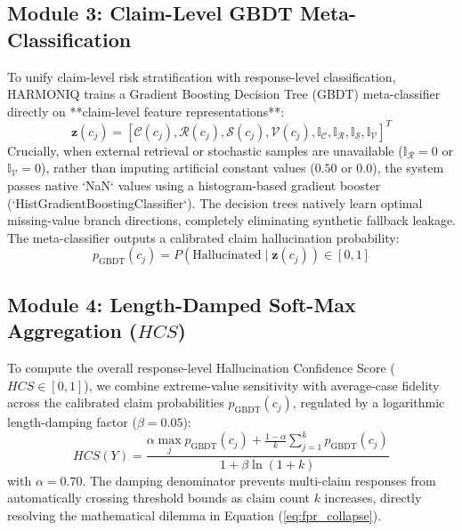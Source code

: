 \documentclass[conference]{IEEEtran}
\begin{document}
\subsection{Module 3: Claim-Level GBDT Meta-Classification}
To unify claim-level risk stratification with response-level classification, HARMONIQ trains a Gradient Boosting Decision Tree (GBDT) meta-classifier directly on **claim-level feature representations**:
\begin{equation}
    \mathbf{z}(c_j) = \left[ \mathcal{C}(c_j), \mathcal{R}(c_j), \mathcal{S}(c_j), \mathcal{V}(c_j), \mathbb{I}_{\mathcal{C}}, \mathbb{I}_{\mathcal{R}}, \mathbb{I}_{\mathcal{S}}, \mathbb{I}_{\mathcal{V}} \right]^T
\end{equation}
Crucially, when external retrieval or stochastic samples are unavailable ($\mathbb{I}_{\mathcal{R}} = 0$ or $\mathbb{I}_{\mathcal{V}} = 0$), rather than imputing artificial constant values ($0.50$ or $0.0$), the system passes native `NaN` values using a histogram-based gradient booster (`HistGradientBoostingClassifier`). The decision trees natively learn optimal missing-value branch directions, completely eliminating synthetic fallback leakage. The meta-classifier outputs a calibrated claim hallucination probability:
\begin{equation}
    p_{\text{GBDT}}(c_j) = P(\text{Hallucinated} \mid \mathbf{z}(c_j)) \in [0, 1]
\end{equation}

\subsection{Module 4: Length-Damped Soft-Max Aggregation ($HCS$)}
To compute the overall response-level Hallucination Confidence Score ($HCS \in [0, 1]$), we combine extreme-value sensitivity with average-case fidelity across the calibrated claim probabilities $p_{\text{GBDT}}(c_j)$, regulated by a logarithmic length-damping factor ($\beta = 0.05$):
\begin{equation}
    HCS(Y) = \frac{\alpha \max_j p_{\text{GBDT}}(c_j) + \frac{1-\alpha}{k}\sum_{j=1}^k p_{\text{GBDT}}(c_j)}{1 + \beta \ln(1 + k)}
\end{equation}
with $\alpha = 0.70$. The damping denominator prevents multi-claim responses from automatically crossing threshold bounds as claim count $k$ increases, directly resolving the mathematical dilemma in Equation (\ref{eq:fpr_collapse}).
\end{document}
